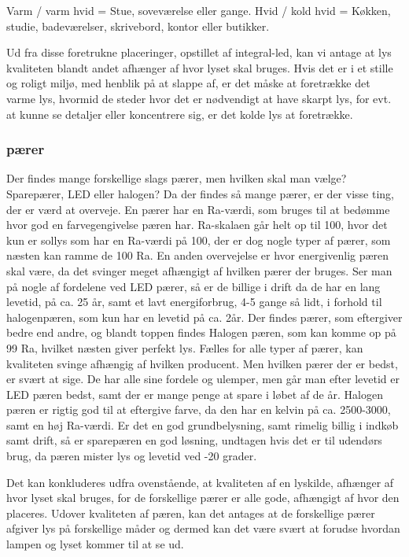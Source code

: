 Varm / varm hvid = Stue, soveværelse eller gange.
\nedline Hvid / kold hvid = Køkken, studie, badeværelser, skrivebord, kontor eller butikker\cite{varm_kold}.

Ud fra disse foretrukne placeringer, opstillet af integral-led, kan vi antage at lys kvaliteten blandt andet afhænger af hvor lyset skal bruges. Hvis det er i et stille og roligt miljø, med henblik på at slappe af, er det måske at foretrække det varme lys, hvormid de steder hvor det er nødvendigt at have skarpt lys, for evt. at kunne se detaljer eller koncentrere sig, er det kolde lys at foretrække.

\subsubsection{pærer}
Der findes mange forskellige slags pærer, men hvilken skal man vælge? Sparepærer, LED eller halogen?
Da der findes så mange pærer, er der visse ting, der er værd at overveje. En pærer har en Ra-værdi, som bruges til at bedømme hvor god en farvegengivelse pæren har. Ra-skalaen går helt op til 100, hvor det kun er sollys som har en Ra-værdi på 100, der er dog nogle typer af pærer, som næsten kan ramme de 100 Ra.\cite{halogen_paere}
\newline En anden overvejelse er hvor energivenlig pæren skal være, da det svinger meget afhængigt af hvilken pærer der bruges. Ser man på nogle af fordelene ved LED pærer, så er de billige i drift da de har en lang levetid, på ca. 25 år, samt et lavt energiforbrug\cite{LED}, 4-5 gange så lidt, i forhold til halogenpæren, som kun har en levetid på ca. 2år\cite{vaelg_paere}. 
Der findes pærer, som eftergiver bedre end andre, og blandt toppen findes Halogen pæren, som kan komme op på 99 Ra, hvilket næsten giver perfekt lys\cite{halogen_paere}. 
\newline Fælles for alle typer af pærer, kan kvaliteten svinge afhængig af hvilken producent. Men hvilken pærer der er bedst, er svært at sige. De har alle sine fordele og ulemper, men går man efter levetid er LED pæren bedst, samt der er mange penge at spare i løbet af de år. Halogen pæren er rigtig god til at eftergive farve, da den har en kelvin på ca. 2500-3000, samt en høj Ra-værdi. Er det en god grundbelysning, samt rimelig billig i indkøb samt drift, så er sparepæren en god løsning, undtagen hvis det er til udendørs brug, da pæren mister lys og levetid ved -20 grader\cite{sparepaerer}.

Det kan konkluderes udfra ovenstående, at kvaliteten af en lyskilde, afhænger af hvor lyset skal bruges, for de forskellige pærer er alle gode, afhængigt af hvor den placeres. Udover kvaliteten af pæren, kan det antages at de forskellige pærer afgiver lys på forskellige måder og dermed kan det være svært at forudse hvordan lampen og lyset kommer til at se ud.  


